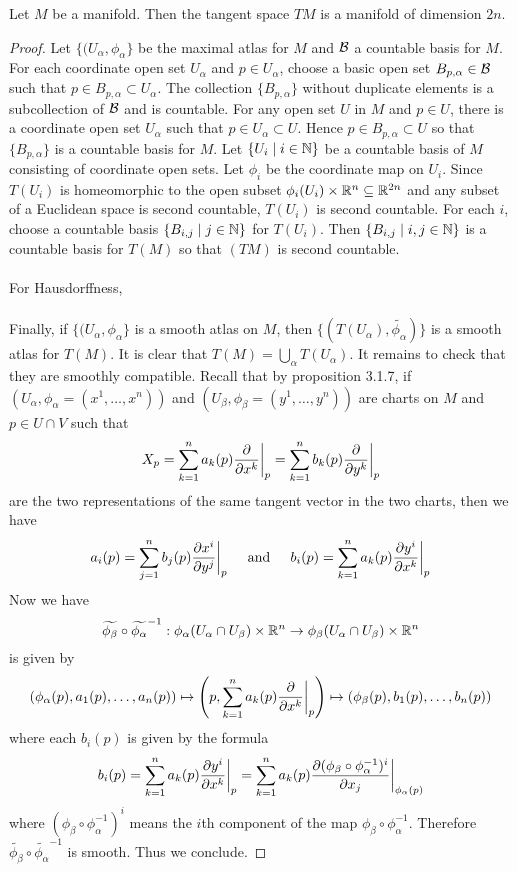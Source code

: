 \documentclass[a4paper]{article}
\begin{document}
\begin{thm}{}{} Let $M$ be a manifold. Then the tangent space $TM$ is a manifold of dimension $2n$. \tcbline
\begin{proof}
Let $\{(U_\alpha,\phi_\alpha\}$ be the maximal atlas for $M$ and $\mathcal{B}$ a countable basis for $M$. For each coordinate open set $U_\alpha$ and $p\in U_\alpha$, choose a basic open set $B_{p,\alpha}\in\mathcal{B}$ such that $p\in B_{p,\alpha}\subset U_\alpha$. The collection $\{B_{p,\alpha}\}$ without duplicate elements is a subcollection of $\mathcal{B}$ and is countable. For any open set $U$ in $M$ and $p\in U$, there is a coordinate open set $U_\alpha$ such that $p\in U_\alpha\subset U$. Hence $p\in B_{p,\alpha}\subset U$ so that $\{B_{p,\alpha}\}$ is a countable basis for $M$. Let $\{U_i\;|\;i\in\mathbb{N}\}$ be a countable basis of $M$ consisting of coordinate open sets. Let $\phi_i$ be the coordinate map on $U_i$. Since $T(U_i)$ is homeomorphic to the open subset $\phi_i(U_i)\times\mathbb{R}^n\subseteq\mathbb{R}^{2n}$ and any subset of a Euclidean space is second countable, $T(U_i)$ is second countable. For each $i$, choose a countable basis $\{B_{i,j}\;|\;j\in\mathbb{N}\}$ for $T(U_i)$. Then $\{B_{i,j}\;|\;i,j\in\mathbb{N}\}$ is a countable basis for $T(M)$ so that $(TM)$ is second countable. \\~\\

For Hausdorffness,\\~\\

Finally, if $\{(U_\alpha,\phi_\alpha\}$ is a smooth atlas on $M$, then $\{(T(U_\alpha),\widetilde{\phi_\alpha})\}$ is a smooth atlas for $T(M)$. It is clear that $T(M)=\bigcup_{\alpha}T(U_\alpha)$. It remains to check that they are smoothly compatible. Recall that by proposition 3.1.7, if $(U_\alpha,\phi_\alpha=(x^1,\dots,x^n))$ and $(U_\beta,\phi_\beta=(y^1,\dots,y^n))$ are charts on $M$ and $p\in U\cap V$ such that $$X_p=\sum_{k=1}^na_k(p)\frac{\partial}{\partial x^k}\bigg{|}_p=\sum_{k=1}^nb_k(p)\frac{\partial}{\partial y^k}\bigg{|}_p$$ are the two representations of the same tangent vector in the two charts, then we have $$a_i(p)=\sum_{j=1}^nb_j(p)\frac{\partial x^i}{\partial y^j}\bigg{|}_p\;\;\;\;\text{ and }\;\;\;\; b_i(p)=\sum_{k=1}^na_k(p)\frac{\partial y^i}{\partial x^k}\bigg{|}_p$$ Now we have $$\widetilde{\phi_\beta}\circ\widetilde{\phi_\alpha}^{-1}:\phi_\alpha(U_\alpha\cap U_\beta)\times\mathbb{R}^n\to\phi_\beta(U_\alpha\cap U_\beta)\times\mathbb{R}^n$$ is given by $$(\phi_\alpha(p),a_1(p),\dots,a_n(p))\mapsto\left(p,\sum_{k=1}^na_k(p)\frac{\partial}{\partial x^k}\bigg{|}_p\right)\mapsto(\phi_\beta(p),b_1(p),\dots,b_n(p))$$ where each $b_i(p)$ is given by the formula $$b_i(p)=\sum_{k=1}^na_k(p)\frac{\partial y^i}{\partial x^k}\bigg{|}_p=\sum_{k=1}^na_k(p)\frac{\partial(\phi_\beta\circ\phi_\alpha^{-1})^i}{\partial x_j}\bigg{|}_{\phi_\alpha(p)}$$ where $(\phi_\beta\circ\phi_\alpha^{-1})^i$ means the $i$th component of the map $\phi_\beta\circ\phi_\alpha^{-1}$. Therefore $\widetilde{\phi_\beta}\circ\widetilde{\phi_\alpha}^{-1}$ is smooth. Thus we conclude. 
\end{proof}
\end{thm}
\end{document}
